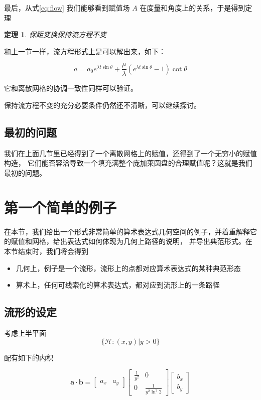 \documentclass[a4paper,12pt]{article}
\numberwithin{definition}{section}
\numberwithin{lemma}{section}
\numberwithin{proposition}{section}
\newtheorem{theorem}{定理}
\numberwithin{theorem}{section}
\numberwithin{grammar}{section}
\numberwithin{program}{section}
\numberwithin{convention}{section}
\numberwithin{corollary}{section}
\begin{document}
最后，从式\eqref{eq:flow} 我们能够看到赋值场 $A$ 在度量和角度上的关系，于是得到定理

\begin{theorem}
保距变换保持流方程不变\label{thm:isometry}
\end{theorem}

和上一节一样，流方程形式上是可以解出来，如下：

\begin{equation}
   a =  a_0 e^{\lambda t \sin \theta} + \frac{\mu}{\lambda} (e^{\lambda t \sin \theta} - 1) \cot \theta
\end{equation}

它和离散网格的协调一致性同样可以验证。

保持流方程不变的充分必要条件仍然还不清晰，可以继续探讨。

\subsection{最初的问题}

我们在上面几节里已经得到了一个离散网格上的赋值，还得到了一个无穷小的赋值构造，
它们能否容洽导致一个填充满整个庞加莱圆盘的合理赋值呢？这就是我们最初的问题。

\newpage

\section{第一个简单的例子}

在本节，我们给出一个形式非常简单的算术表达式几何空间的例子，并着重解释它的赋值和网格，给出表达式如何体现为几何上路径的说明，
并导出典范形式。在本节结束时，我们将会得到
\begin{itemize}
    \item 几何上，例子是一个流形，流形上的点都对应算术表达式的某种典范形态
    \item 算术上，任何可线索化的算术表达式，都对应到流形上的一条路径
\end{itemize}

\subsection{流形的设定}

考虑上半平面
\[
\{\mathcal{H}: (x, y) | y > 0 \}
\]

配有如下的内积

\[
\mathbf{a} \cdot \mathbf{b} = \begin{bmatrix} a_x & a_y \end{bmatrix} \begin{bmatrix} \frac{1}{y^2} & 0 \\ 0 & \frac{1}{y^2\ln^2{2}} \end{bmatrix} \begin{bmatrix} b_x \\ b_y \end{bmatrix}
\]
\end{document}

